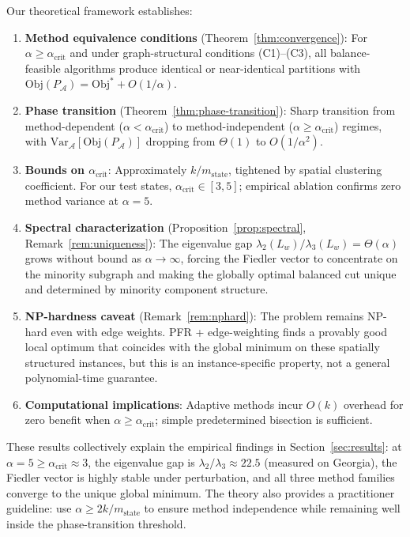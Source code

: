 Our theoretical framework establishes:

\begin{enumerate}
    \item \textbf{Method equivalence conditions} (Theorem~\ref{thm:convergence}): For $\alpha \geq \alpha_{\text{crit}}$ and under graph-structural conditions (C1)--(C3), all balance-feasible algorithms produce identical or near-identical partitions with $\mathrm{Obj}(P_{\mathcal{A}}) = \mathrm{Obj}^* + O(1/\alpha)$.

    \item \textbf{Phase transition} (Theorem~\ref{thm:phase-transition}): Sharp transition from method-dependent ($\alpha < \alpha_{\text{crit}}$) to method-independent ($\alpha \geq \alpha_{\text{crit}}$) regimes, with $\mathrm{Var}_{\mathcal{A}}[\mathrm{Obj}(P_{\mathcal{A}})]$ dropping from $\Theta(1)$ to $O(1/\alpha^2)$.

    \item \textbf{Bounds on $\alpha_{\text{crit}}$}: Approximately $k / m_{\text{state}}$, tightened by spatial clustering coefficient. For our test states, $\alpha_{\text{crit}} \in [3, 5]$; empirical ablation confirms zero method variance at $\alpha = 5$.

    \item \textbf{Spectral characterization} (Proposition~\ref{prop:spectral}, Remark~\ref{rem:uniqueness}): The eigenvalue gap $\lambda_2(L_w)/\lambda_3(L_w) = \Theta(\alpha)$ grows without bound as $\alpha \to \infty$, forcing the Fiedler vector to concentrate on the minority subgraph and making the globally optimal balanced cut unique and determined by minority component structure.

    \item \textbf{NP-hardness caveat} (Remark~\ref{rem:nphard}): The problem remains NP-hard even with edge weights. PFR + edge-weighting finds a provably good local optimum that coincides with the global minimum on these spatially structured instances, but this is an instance-specific property, not a general polynomial-time guarantee.

    \item \textbf{Computational implications}: Adaptive methods incur $O(k)$ overhead for zero benefit when $\alpha \geq \alpha_{\text{crit}}$; simple predetermined bisection is sufficient.
\end{enumerate}

These results collectively explain the empirical findings in Section~\ref{sec:results}: at $\alpha = 5 \geq \alpha_{\text{crit}} \approx 3$, the eigenvalue gap is $\lambda_2/\lambda_3 \approx 22.5$ (measured on Georgia), the Fiedler vector is highly stable under perturbation, and all three method families converge to the unique global minimum. The theory also provides a practitioner guideline: use $\alpha \geq 2k / m_{\text{state}}$ to ensure method independence while remaining well inside the phase-transition threshold.

